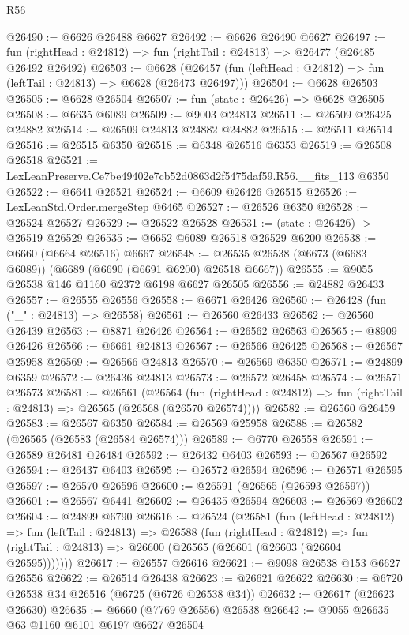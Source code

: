 \begin{lexlean}{R56}
\begin{coremodule}
@26490 := @6626 @26488 @6627
@26492 := @6626 @26490 @6627
@26497 := fun (rightHead : @24812) => fun (rightTail : @24813) => @26477 (@26485 @26492 @26492)
@26503 := @6628
    (@26457 (fun (leftHead : @24812) => fun (leftTail : @24813) => @6628 (@26473 @26497)))
@26504 := @6628 @26503
@26505 := @6628 @26504
@26507 := fun (state : @26426) => @6628 @26505
@26508 := @6635 @6089
@26509 := @9003 @24813
@26511 := @26509 @26425 @24882
@26514 := @26509 @24813 @24882 @24882
@26515 := @26511 @26514
@26516 := @26515 @6350
@26518 := @6348 @26516 @6353
@26519 := @26508 @26518
@26521 := LexLeanPreserve.Ce7be49402e7cb52d0863d2f5475daf59.R56.__fits_113 @6350
@26522 := @6641 @26521
@26524 := @6609 @26426 @26515
@26526 := LexLeanStd.Order.mergeStep @6465
@26527 := @26526 @6350
@26528 := @26524 @26527
@26529 := @26522 @26528
@26531 := (state : @26426) -> @26519 @26529
@26535 := @6652 @6089 @26518 @26529 @6200
@26538 := @6660 (@6664 @26516) @6667
@26548 := @26535 @26538 (@6673 (@6683 @6089)) (@6689 (@6690 (@6691 @6200) @26518 @6667))
@26555 := @9055 @26538 @146 @1160 @2372 @6198 @6627 @26505
@26556 := @24882 @26433
@26557 := @26555 @26556
@26558 := @6671 @26426
@26560 := @26428 (fun ("_" : @24813) => @26558)
@26561 := @26560 @26433
@26562 := @26560 @26439
@26563 := @8871 @26426
@26564 := @26562 @26563
@26565 := @8909 @26426
@26566 := @6661 @24813
@26567 := @26566 @26425
@26568 := @26567 @25958
@26569 := @26566 @24813
@26570 := @26569 @6350
@26571 := @24899 @6359
@26572 := @26436 @24813
@26573 := @26572 @26458
@26574 := @26571 @26573
@26581 := @26561
    (@26564
      (fun (rightHead : @24812) => fun (rightTail : @24813) => @26565 (@26568 (@26570 @26574))))
@26582 := @26560 @26459
@26583 := @26567 @6350
@26584 := @26569 @25958
@26588 := @26582 (@26565 (@26583 (@26584 @26574)))
@26589 := @6770 @26558
@26591 := @26589 @26481 @26484
@26592 := @26432 @6403
@26593 := @26567 @26592
@26594 := @26437 @6403
@26595 := @26572 @26594
@26596 := @26571 @26595
@26597 := @26570 @26596
@26600 := @26591 (@26565 (@26593 @26597))
@26601 := @26567 @6441
@26602 := @26435 @26594
@26603 := @26569 @26602
@26604 := @24899 @6790
@26616 := @26524
    (@26581
      (fun (leftHead : @24812) =>
      fun (leftTail : @24813) =>
      @26588
        (fun (rightHead : @24812) =>
        fun (rightTail : @24813) => @26600 (@26565 (@26601 (@26603 (@26604 @26595)))))))
@26617 := @26557 @26616
@26621 := @9098 @26538 @153 @6627 @26556
@26622 := @26514 @26438
@26623 := @26621 @26622
@26630 := @6720 @26538 @34 @26516 (@6725 (@6726 @26538 @34))
@26632 := @26617 (@26623 @26630)
@26635 := @6660 (@7769 @26556) @26538
@26642 := @9055 @26635 @63 @1160 @6101 @6197 @6627 @26504

\end{coremodule}
\end{lexlean}

